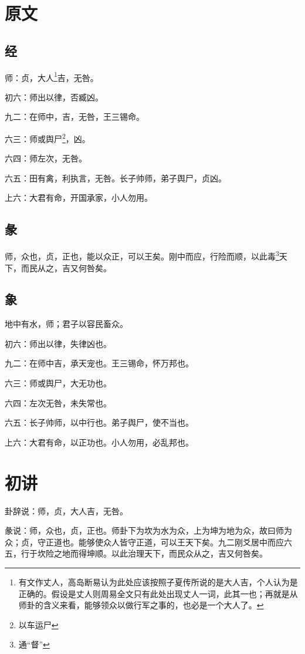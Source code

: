 \documentclass[12pt,oneside]{book}
\begin{document}
\section{原文}
\subsection{经}
师：贞，大人\footnote{有文作丈人，高岛断易认为此处应该按照子夏传所说的是大人吉，个人认为是正确的。假设是丈人则周易全文只有此处出现丈人一词，此其一也；再就是从师卦的含义来看，能够领众以做行军之事的，也必是一个大人了。}吉，无咎。

初六：师出以律，否臧凶。

九二：在师中，吉，无咎，王三锡命。

六三：师或舆尸\footnote{以车运尸}，凶。

六四：师左次，无咎。

六五：田有禽，利执言，无咎。长子帅师，弟子舆尸，贞凶。

上六：大君有命，开国承家，小人勿用。

\subsection{彖}
师，众也，贞，正也，能以众正，可以王矣。刚中而应，行险而顺，以此毒\footnote{通“督”}天下，而民从之，吉又何咎矣。

\subsection{象}
地中有水，师；君子以容民畜众。

初六：师出以律，失律凶也。

九二：在师中吉，承天宠也。王三锡命，怀万邦也。

六三：师或舆尸，大无功也。

六四：左次无咎，未失常也。

六五：长子帅师，以中行也。弟子舆尸，使不当也。

上六：大君有命，以正功也。小人勿用，必乱邦也。

\section{初讲}
卦辞说：师，贞，大人吉，无咎。

彖说：师，众也，贞，正也。师卦下为坎为水为众，上为坤为地为众，故曰师为众；贞，守正道也。能够使众人皆守正道，可以王天下矣。九二刚爻居中而应六五，行于坎险之地而得坤顺。以此治理天下，而民众从之，吉又何咎矣。
\end{document}
